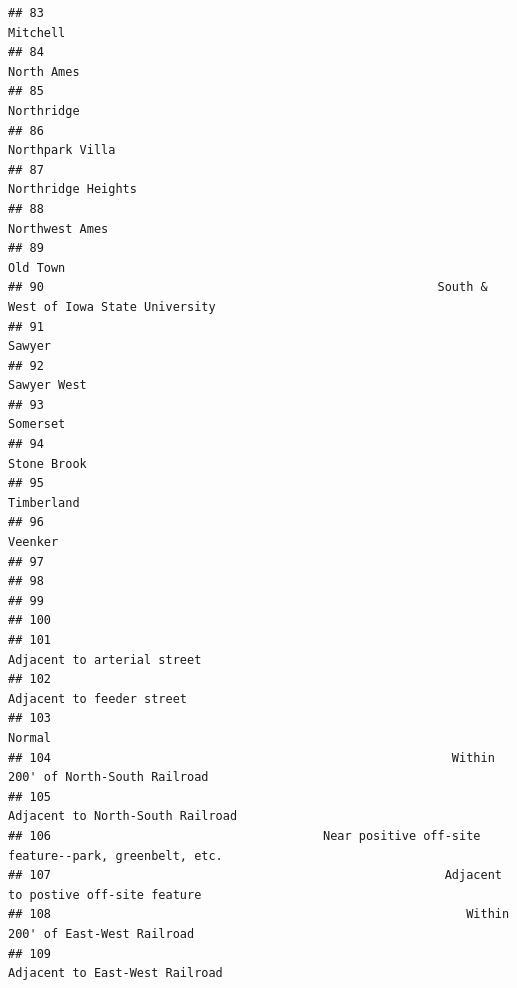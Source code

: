 \documentclass[
]{article}
\begin{document}
\begin{verbatim}
## 83                                                                                    Mitchell
## 84                                                                                  North Ames
## 85                                                                                  Northridge
## 86                                                                             Northpark Villa
## 87                                                                          Northridge Heights
## 88                                                                              Northwest Ames
## 89                                                                                    Old Town
## 90                                                       South & West of Iowa State University
## 91                                                                                      Sawyer
## 92                                                                                 Sawyer West
## 93                                                                                    Somerset
## 94                                                                                 Stone Brook
## 95                                                                                  Timberland
## 96                                                                                     Veenker
## 97                                                                                            
## 98                                                                                            
## 99                                                                                            
## 100                                                                                           
## 101                                                                Adjacent to arterial street
## 102                                                                  Adjacent to feeder street
## 103                                                                                     Normal
## 104                                                        Within 200' of North-South Railroad
## 105                                                           Adjacent to North-South Railroad
## 106                                      Near positive off-site feature--park, greenbelt, etc.
## 107                                                       Adjacent to postive off-site feature
## 108                                                          Within 200' of East-West Railroad
## 109                                                             Adjacent to East-West Railroad

\end{verbatim}
\end{document}
